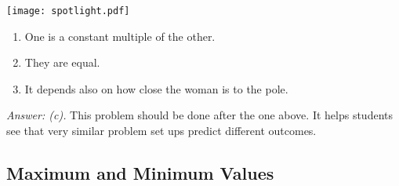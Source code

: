 \documentclass[12pt]{article}
\begin{document}
\begin{enumerate}
\begin{center}
\texttt{[image: spotlight.pdf]}
\end{center}

\begin{enumerate}
\renewcommand{\theenumii}{\alph{enumii}}
\item One is a constant multiple of the other.
\item They are equal.
\item It depends also on how close the woman is to the pole.
\end{enumerate}

{\it Answer: (c).} This problem should be done after the one
above. It helps students see that very similar problem set ups
predict different outcomes. 

\end{enumerate}

\subsection{Maximum and Minimum Values}
\end{document}
